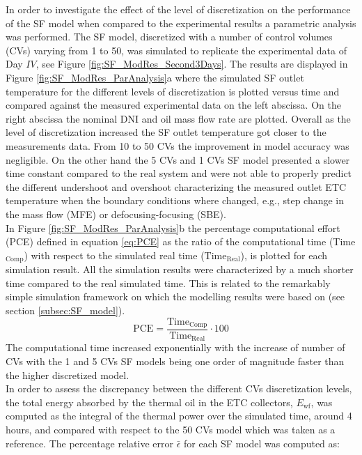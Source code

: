 \documentclass[final,3p,times,review]{elsarticle}
\begin{document}
In order to investigate the effect of the level of discretization on the performance of the SF model when compared to the experimental results a parametric analysis was performed. The SF model, discretized with a number of control volumes (CVs) varying from 1 to 50,  was simulated to replicate the  experimental data of Day $IV$, see Figure \ref{fig:SF_ModRes_Second3Days}. The results are displayed in Figure \ref{fig:SF_ModRes_ParAnalysis}a where the simulated SF outlet temperature for the different levels of discretization is plotted versus time and compared against the measured experimental data on the left abscissa. On the right abscissa the nominal DNI and oil mass flow rate are plotted. Overall as the level of discretization increased the SF outlet temperature got closer to the measurements data. From 10 to 50 CVs the improvement in model accuracy was negligible. On the other hand the 5 CVs and 1 CVs SF model presented a slower time constant compared to the real system and were not able to properly predict the different undershoot and overshoot characterizing the measured outlet ETC temperature when the boundary conditions where changed, e.g., step change in the mass flow (MFE) or defocusing-focusing (SBE).\\
In Figure \ref{fig:SF_ModRes_ParAnalysis}b the percentage computational effort (PCE) defined in equation \ref{eq:PCE} as the ratio of the computational time (Time$_\mathrm{Comp}$) with respect to the simulated real time ($\mathrm{Time}_\mathrm{Real}$), is plotted for each simulation result. All the simulation results were characterized by a much shorter time compared to the real simulated time. This is related to the remarkably simple simulation framework on which the modelling results were based on (see section \ref{subsec:SF_model}). 
%
\begin{equation}
\mathrm{PCE} = \frac{\mathrm{Time}_\mathrm{Comp}}{\mathrm{Time}_\mathrm{Real}} \cdot 100
\label{eq:PCE}
\end{equation}
%
The computational time increased exponentially with the increase of number of CVs with the 1 and 5 CVs SF models being one order of magnitude faster than the higher discretized model.\\
In order to assess the discrepancy between the different CVs discretization levels, the total energy absorbed by the thermal oil in the ETC collectors, $E_\mathrm{wf}$,  was computed as the integral of the thermal power over the simulated time, around 4 hours, and compared with respect to the 50 CVs model which was taken as a reference. The percentage relative error $\bar{\epsilon}$ for each SF model was computed as:
\end{document}
